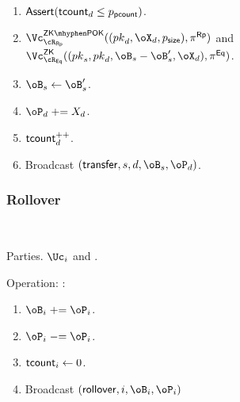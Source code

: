 \begin{protocol}
\begin{enumerate}
		\begin{enumerate}
			
			\item  $\mathsf{Assert}(\mathsf{tcount}_d \le p_{\mathsf{pcount}})$.
				
			\item   $\vZKPOK{\rRp}((\pk_d,\oX_d,\psize),\pi^\RPs)$
			 and $\vZK{\rEq}((\pk_s,\pk_d,\oB_s- \oB_s',\oX_d),\pi^\Eqs )$. 
			
	
		
		
		     \item   $\oB_s\asn \oB_s'$. 
              
              \item  $\oP_d \pluseq X_d$. 
              
              \item $\mathsf{tcount}_d^{++}$.
              
		     
		     \item Broadcast $(\transfer,s,d,\oB_s,\oP_d)$.
		\end{enumerate}
		
	\end{enumerate}
	
\end{protocol}



\subsubsection{Rollover}

\begin{protocol}~\label{prot:ConfidentialTransactions:Rollover}
	\item[Parties.] $\Uc_i$ and \Cc.
	
\item[Operation:] \Cc:
	
	\begin{enumerate}
	
	\item $\oB_i  \pluseq \oP_i$.
	
	
	\item  $\oP_i \minuseq \oP_i$.
	
	\item  $\mathsf{tcount}_i \leftarrow 0$.
	
	
	\item  Broadcast $(\rollover,i,\oB_i,\oP_i)$
	
	
\end{enumerate}
	
\end{protocol}

